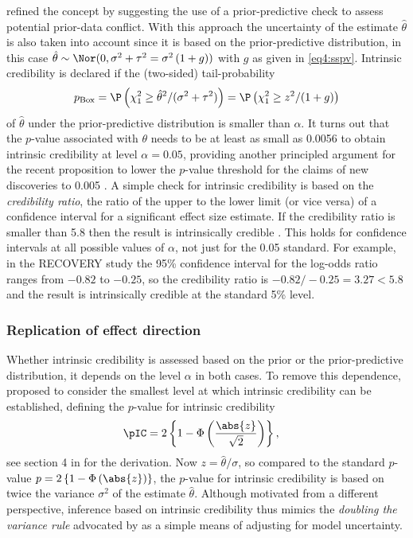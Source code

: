 \citet{Held2019a} refined the concept by suggesting the use of a
prior-predictive check \citep{Box1980, Evans2006} to assess potential prior-data
conflict. With this approach the uncertainty of the estimate $\hat{\theta}$ is
also taken into account since it is based on the prior-predictive distribution,
in this case $\hat\theta \sim \Nor(0, \sigma^2 + \tau^2=\sigma^2 \, (1+g))$ with
$g$ as given in \eqref{eq4:sspv}. Intrinsic credibility is declared if the
(two-sided) tail-probability
\begin{equation*}
  p_{\text{Box}} = \P\left(\chi^2_1 \geq \hat \theta^2/(\sigma^2+\tau^2)\right) = \P\left(\chi^2_1 \geq z^2/(1+g)\right)
\end{equation*}
of $\hat{\theta}$ under the prior-predictive distribution is smaller than
$\alpha$. It turns out that the $p$-value associated with $\theta$ needs to be
at least as small as 0.0056 to obtain intrinsic credibility at level
$\alpha=0.05$, providing another principled argument for the recent proposition
to lower the \mbox{$p$-value} threshold for the claims of new discoveries to
0.005 \citep{Benjamin2017}. A simple check for intrinsic credibility is based on
the \emph{credibility ratio}, the ratio of the upper to the lower limit (or vice
versa) of a confidence interval for a significant effect size estimate. If the
credibility ratio is smaller than 5.8 then the result is intrinsically credible
\citep{Held2019a}. This holds for confidence intervals at all possible values of
$\alpha$, not just for the 0.05 standard. For example, in the RECOVERY study the
95\% confidence interval for the log-odds ratio ranges from $-0.82$ to $-0.25$,
so the credibility ratio is $-0.82/-0.25 = 3.27 < 5.8$ and the result is
intrinsically credible at the standard 5\% level.


\subsubsection*{Replication of effect direction}

Whether intrinsic credibility is assessed based on the prior or the
prior-predictive distribution, it depends on the level $\alpha$ in both cases.
To remove this dependence, \citet{Held2019a} proposed to consider the
smallest level at which intrinsic credibility can be established, defining the
$p$-value for intrinsic credibility
\begin{align}
  \label{eq4:pic}
  \pIC
  &= 2\left\{1 - \Phi\left(\frac{\abs{z}}{\sqrt{2}}\right)\right\},
\end{align}
see section 4 in \citet{Held2019a} for the derivation. Now
$z=\hat \theta/\sigma$, so compared to the standard $p$-value
$p=2\left\{1 - \Phi\left(\abs{z}\right)\right\}$, the $p$-value for intrinsic
credibility is based on twice the variance $\sigma^2$ of the estimate
$\hat{\theta}$. Although motivated from a different perspective, inference based
on intrinsic credibility thus mimics the \emph{doubling the variance rule}
advocated by \citet{Copas2005} as a simple means of adjusting for model
uncertainty.

